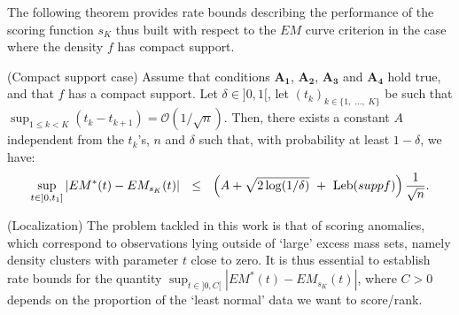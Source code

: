 The following theorem provides rate bounds describing the performance of the scoring function $s_K$ thus built with respect to the $EM$ curve criterion
 in the case where the density $f$ has compact support.
\begin{theorem}{\sc (Compact support case)}
\label{aistat:compact_support_case}
Assume that conditions $\mathbf{A_1}$, $\mathbf{A_2}$, $\mathbf{A_3}$ and $\mathbf{A_4}$ hold true, and that $f$ has a compact support. Let $\delta \in ]0,1[$, let
 $(t_k)_{k\in\{1,\;\ldots,\; K\}}$ be such that  $\sup_{1\leq k< K}(t_{k}-t_{k+1}) = \mathcal{O}(1/\sqrt{n})$.
Then, there exists a constant $A$ independent from the $t_k$'s, $n$ and
$\delta$ such that, with probability at least  $1-\delta$, we have:
\begin{align*}
\sup_{t \in ]0,t_1]} |EM^*(t)-EM_{s_K}(t)| ~~\le~~\left(A+\sqrt{2 \log(1/\delta)}~+~\text{Leb}(supp f)\right)\frac{1}{\sqrt{n}}.
\end{align*}
\end{theorem}

\begin{remark}
\label{aistat:supf}{\sc (Localization)}
The problem tackled in this work is that of scoring anomalies, which correspond to observations lying 
 outside of `large' excess mass sets, namely density clusters with parameter $t$
close to zero. It is thus essential to establish rate bounds %
for the quantity $\sup_{t \in ]0,C[} |EM^*(t)-EM_{s_K}(t)|$, where $C>0$ depends
on the proportion of the `least normal' data we want to score/rank. 
\end{remark}

